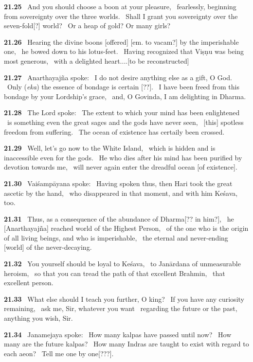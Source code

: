 \documentclass{article}
\newcommand{\skt}[1]{\textit{#1}}
\begin{document}
\textbf{21.25}%
\ And you should choose a boon at your pleasure,%
\ fearlessly, beginning from sovereignty over the three worlds.%
\ Shall I grant you sovereignty over the seven-fold[?] world?%
\ Or a heap of gold? Or many girls?%


\textbf{21.26}%
\ Hearing the divine boons [offered] [em. to vacam?] by the imperishable one,%
\ he bowed down to his lotus-feet.%
\ Having recognized that Viṣṇu was being most generous,%
\ with a delighted heart....[to be reconstructed]%


\textbf{21.27}%
\ Anarthayajña spoke:%
\ I do not desire anything else as a gift, O God.%
\ Only (\skt{eka}) the essence of bondage is certain [??].%
\ I have been freed from this bondage by your Lordship's grace,%
\ and, O Govinda, I am delighting in Dharma.%


\textbf{21.28}%
\ The Lord spoke:%
\ The extent to which your mind has been enlightened%
\ is something even the great sages and the gods have never seen,%
\ [this] spotless freedom from suffering.%
\ The ocean of existence has certaily been crossed.%


\textbf{21.29}%
\ Well, let's go now to the White Island,%
\ which is hidden and is inaccessible even for the gods.%
\ He who dies after his mind has been purified by devotion towards me,%
\ will never again enter the dreadful ocean [of existence].%


\textbf{21.30}%
\ Vaiśampāyana spoke:%
\ Having spoken thus, then Hari took the great ascetic by the hand,%
\ who disappeared in that moment, and with him Keśava, too.%


\textbf{21.31}%
\ Thus, as a consequence of the abundance of Dharma[?? in him?],%
\ he [Anarthayajña] reached world of the Highest Person,%
\ of the one who is the origin of all living beings, and who is imperishable,%
\ the eternal and never-ending [world] of the never-decaying.%


\textbf{21.32}%
\ You yourself should be loyal to Keśava,%
\ to Janārdana of unmeasurable heroism,%
\ so that you can tread the path of that excellent Brahmin,%
\ that excellent person.%


\textbf{21.33}%
\ What else should I teach you further, O king?%
\ If you have any curiosity remaining,%
\ ask me,  Sir, whatever you want%
\ regarding the future or the past, anything you wish, Sir.%


\textbf{21.34}%
\ Janamejaya spoke:%
\ How many kalpas have passed until now?%
\ How many are the future kalpas?%
\ How many Indras are taught to exist with regard to each aeon?%
\ Tell me one by one[???].%
\end{document}
